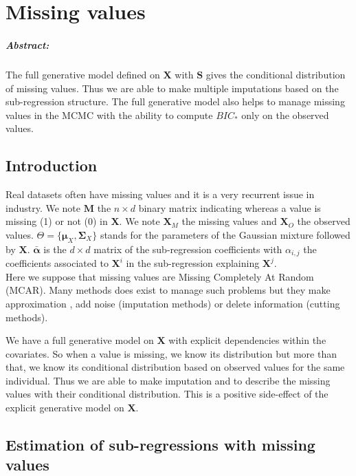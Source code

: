 \documentclass[12pt,a4paper]{report}
\begin{document}
\FloatBarrier

\chapter{Missing values} \label{chapmiss}
	\paragraph{Abstract:} The full generative model defined on $\boldsymbol{X}$ with $\boldsymbol{S}$ gives the conditional distribution of missing values. Thus we are able to make multiple imputations based on the sub-regression structure. The full generative model also helps to manage missing values in the MCMC with the ability to compute $BIC_*$ only on the observed values. 
	
	 \section{Introduction}
	Real datasets often have missing values and it is a very recurrent issue in industry. We note $\boldsymbol{M}$ the $n\times d$ binary matrix indicating whereas a value is missing (1) or not (0) in $\boldsymbol{X}$.
	We note $\boldsymbol{X}_M$ the missing values and $\boldsymbol{X}_{O}$ the observed values. $\Theta=\{\boldsymbol{\mu}_X,\boldsymbol{\Sigma}_X \}$ stands for the parameters of the Gaussian mixture followed by $\boldsymbol{X}$.
	$\bar{\boldsymbol{\alpha}}$ is the $d\times d$ matrix of the sub-regression coefficients with $\alpha_{i,j}$ the coefficients associated to $\boldsymbol{X}^i$ in the sub-regression explaining $\boldsymbol{X}^j$.\\ 
			Here we suppose that missing values are Missing Completely At Random (MCAR). 
	 Many methods does exist to manage such problems \cite{little1992regression} but they make approximation , add noise (imputation methods) or delete information (cutting methods).	
	 
%	 
%	 
	We have a full generative model on $\boldsymbol{X}$ with explicit dependencies within the covariates. So when a value is missing, we know its distribution but more than that, we know its conditional distribution based on observed values for the same individual. Thus we are able to make imputation and to describe the missing values with their conditional distribution. This is a positive side-effect of the explicit generative model on $\boldsymbol{X}$. 
\section{Estimation of sub-regressions with missing values}
\end{document}

